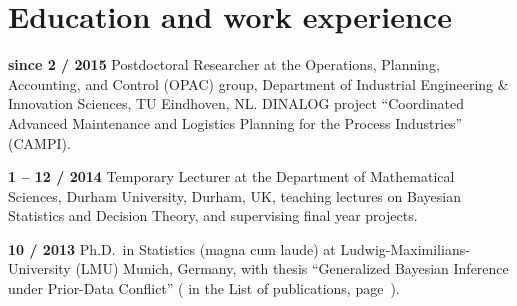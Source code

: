 \documentclass[a4paper]{simplecv}
\begin{document}
\newpage
\section{Education and work experience}
\label{education}


\begin{topic}
\item[\hspace*{-2ex}\bfseries since 2 / 2015] Postdoctoral Researcher
                  at the Operations, Planning, Accounting, and Control (OPAC) group,
                  Department of Industrial Engineering \& Innovation Sciences,
                  TU Eindhoven, NL.
DINALOG project ``Coordinated Advanced Maintenance and Logistics Planning for the Process Industries'' (CAMPI).

\item[\hspace*{-2ex}\bfseries 1 -- 12 / 2014]Temporary Lecturer
                  at the Department of Mathematical Sciences,
                  Durham University, Durham, UK,
                  teaching lectures on Bayesian Statistics and Decision Theory,
                  and supervising final year projects. 


\item[\hspace*{-2ex}\bfseries 10 / 2013] Ph.D.\ in Statistics (magna cum laude) at
                  Lud\-wig-Maximi\-li\-ans-Uni\-ver\-si\-ty (LMU) Munich, Germany,
                  with thesis ``Generalized Bayesian Inference under Prior-Data Conflict''
                  (\cite{diss} in the List of publications, page~\pageref{publications}).



\end{topic}
\end{document}

